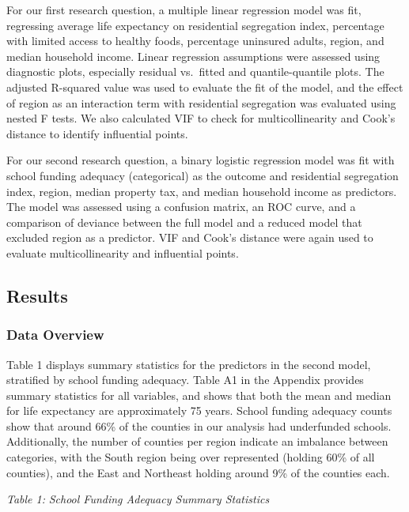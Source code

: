 \documentclass[
  10pt,
  letterpaper,
  DIV=11,
  numbers=noendperiod]{scrartcl}
\begin{document}
For our first research question, a multiple linear regression model was
fit, regressing average life expectancy on residential segregation
index, percentage with limited access to healthy foods, percentage
uninsured adults, region, and median household income. Linear regression
assumptions were assessed using diagnostic plots, especially residual
vs.~fitted and quantile-quantile plots. The adjusted R-squared value was
used to evaluate the fit of the model, and the effect of region as an
interaction term with residential segregation was evaluated using nested
F tests. We also calculated VIF to check for multicollinearity and
Cook's distance to identify influential points.~

For our second research question, a binary logistic regression model was
fit with school funding adequacy (categorical) as the outcome and
residential segregation index, region, median property tax, and median
household income as predictors. The model was assessed using a confusion
matrix, an ROC curve, and a comparison of deviance between the full
model and a reduced model that excluded region as a predictor. VIF and
Cook's distance were again used to evaluate multicollinearity and
influential points.

\subsection{Results}\label{results}

\subsubsection{Data Overview}\label{data-overview}

Table 1 displays summary statistics for the predictors in the second
model, stratified by school funding adequacy. Table A1 in the Appendix
provides summary statistics for all variables, and shows that both the
mean and median for life expectancy are approximately 75 years. School
funding adequacy counts show that around 66\% of the counties in our
analysis had underfunded schools. Additionally, the number of counties
per region indicate an imbalance between categories, with the South
region being over represented (holding 60\% of all counties), and the
East and Northeast holding around 9\% of the counties each.

\newpage

\emph{Table 1:} \emph{School Funding Adequacy Summary Statistics}
\end{document}
